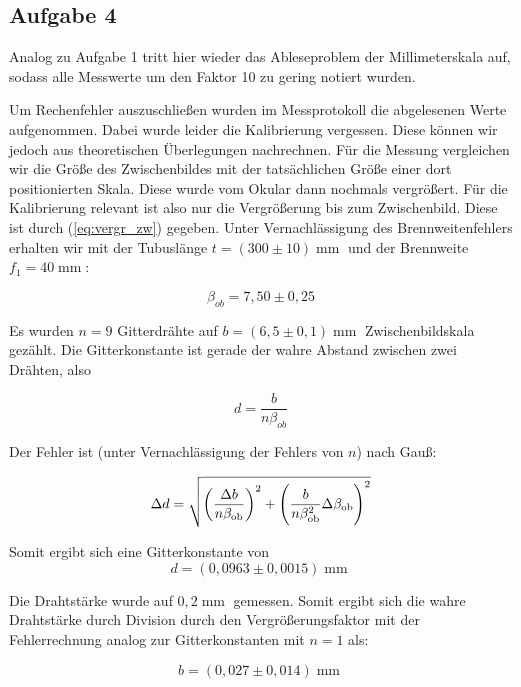 \documentclass[a4paper,german,12pt,smallheadings]{scrartcl}
\begin{document}
\subsection{Aufgabe 4}
Analog zu Aufgabe 1 tritt hier wieder das Ableseproblem der Millimeterskala
auf, sodass alle Messwerte um den Faktor 10 zu gering notiert wurden.

Um Rechenfehler auszuschließen wurden im Messprotokoll die abgelesenen Werte
aufgenommen. Dabei wurde leider die Kalibrierung vergessen. Diese können wir
jedoch aus theoretischen Überlegungen nachrechnen. Für die Messung vergleichen
wir die Größe des Zwischenbildes mit der tatsächlichen Größe einer dort
positionierten Skala. Diese wurde vom Okular dann nochmals vergrößert. Für
die Kalibrierung relevant ist also nur die Vergrößerung bis zum Zwischenbild.
Diese ist durch (\ref{eq:vergr_zw}) gegeben. Unter Vernachlässigung des
Brennweitenfehlers erhalten wir mit der Tubuslänge $t = (300\pm10)
\operatorname{mm}$ und der Brennweite $f_1 = 40 \operatorname{mm}$:

\begin{equation}
  \beta_{ob} = 7{,}50 \pm 0{,}25
\end{equation}

Es wurden $n = 9$ Gitterdrähte auf $b = (6{,}5\pm0{,}1) \operatorname{mm}$
Zwischenbildskala gezählt. Die Gitterkonstante ist gerade der wahre Abstand
zwischen zwei Drähten, also

\begin{equation}
  d = \frac{b}{n \beta_{ob}}
\end{equation}

Der Fehler ist (unter Vernachlässigung der Fehlers von $n$) nach Gauß:

\begin{equation}
  \Delta d = \sqrt{
    \del{\frac{\Delta b}{n \beta_\text{ob}}}^2 +
    \del{\frac{b}{n \beta_\text{ob}^2} \Delta \beta_\text{ob}}^2
  }
\end{equation}

Somit ergibt sich eine Gitterkonstante von
\begin{equation}
  d = (0{,}0963 \pm 0{,}0015) \operatorname{mm}
\end{equation}

Die Drahtstärke wurde auf $0{,}2 \operatorname{mm}$ gemessen. Somit ergibt sich
die wahre Drahtstärke durch Division durch den Vergrößerungsfaktor mit der
Fehlerrechnung analog zur Gitterkonstanten mit $n = 1$ als:

\begin{equation}
  b = (0{,}027\pm0{,}014) \operatorname{mm}
\end{equation}
\end{document}
